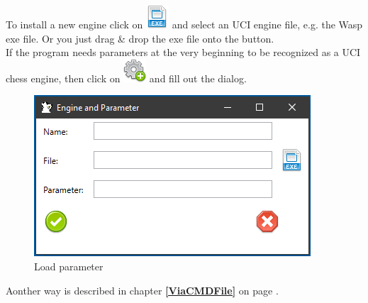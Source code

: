 \documentclass[11pt,a4paper]{article}
\begin{document}
	To install a new engine click on \includegraphics[scale=0.5]{file_extension_exe.png} and select an UCI engine file, e.g. the Wasp exe file. Or you just drag \& drop the exe file onto the button.\\
	If the program needs parameters at the very beginning to be recognized as a UCI chess engine, then click on \includegraphics[scale=0.5]{cog_add.png} and fill out the dialog.\\
	
	\begin{figure}[H]
		\centering
		\includegraphics[scale=1.0]{loadEngine3.png}
		\caption{Load parameter}
		\label{fig:LoadEngine4}
	\end{figure}
	Aonther way is described in chapter \textbf{\ref{ViaCMDFile}  } on page \pageref{ViaCMDFile}.\\
	
\end{document}
